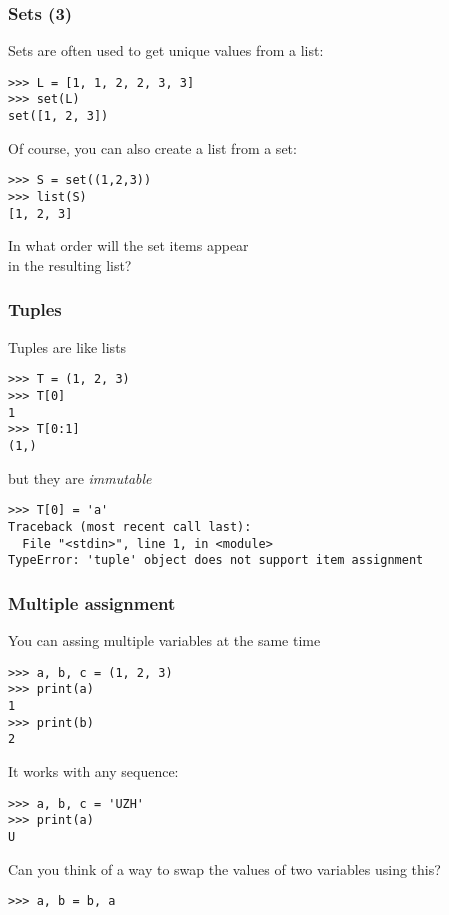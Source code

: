 \documentclass[english,serif,mathserif,xcolor=pdftex,dvipsnames,table]{beamer}
\begin{document}
\begin{frame}[fragile]
  \frametitle{Sets (3)}
  Sets are often used to get unique values from a list:
  \begin{lstlisting}
>>> L = [1, 1, 2, 2, 3, 3]
>>> set(L)
set([1, 2, 3])
 \end{lstlisting}

\+\pause
Of course, you can also create a list from a set:
\begin{lstlisting}
>>> S = set((1,2,3))
>>> list(S)
[1, 2, 3]
\end{lstlisting}

\+\pause
\begin{question}
  In what order will the set items appear \\ in the resulting list?
\end{question}

\end{frame}


\begin{frame}[fragile]
  \frametitle{Tuples}
  Tuples are like lists
  \begin{lstlisting}
>>> T = (1, 2, 3)
>>> T[0]
1
>>> T[0:1]
(1,)
  \end{lstlisting}

  \+
but they are \textit{immutable}

\begin{lstlisting}[basicstyle=\footnotesize\ttfamily]
>>> T[0] = 'a'
Traceback (most recent call last):
  File "<stdin>", line 1, in <module>
TypeError: 'tuple' object does not support item assignment
\end{lstlisting}
\end{frame}


\begin{frame}[fragile]
\frametitle{Multiple assignment}
You can assing multiple variables at the same time
\begin{lstlisting}
>>> a, b, c = (1, 2, 3)
>>> print(a)
1
>>> print(b)
2
\end{lstlisting}

\+

It works with any sequence:

\begin{lstlisting}
>>> a, b, c = 'UZH'
>>> print(a)
U
\end{lstlisting}

\pause
\begin{question}
  Can you think of a way to swap the values of two variables using this?
\pause
\begin{lstlisting}
>>> a, b = b, a
\end{lstlisting}
\end{question}
\end{frame}
\end{document}
